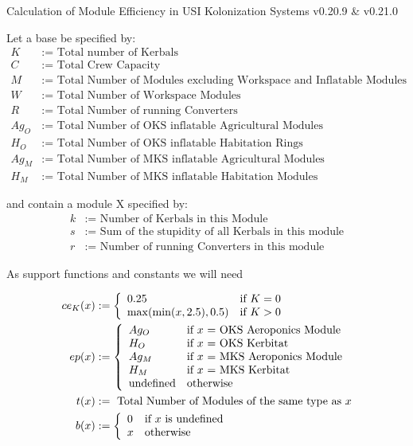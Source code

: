 \documentclass[10pt]{report}
\begin{document}
Calculation of Module Efficiency in USI Kolonization Systems v0.20.9 \& v0.21.0

Let a base be specified by:
\begin{align*}
  K & := \textrm{ Total number of Kerbals}\\
  C & := \textrm{ Total Crew Capacity}\\
  M & := \textrm{ Total Number of Modules excluding Workspace and Inflatable Modules}\\
  W & := \textrm{ Total Number of Workspace Modules}\\
  R & := \textrm{ Total Number of running Converters}\\
  Ag_O & := \textrm{ Total Number of OKS inflatable Agricultural Modules}\\
  H_O & := \textrm{ Total Number of OKS inflatable Habitation Rings}\\
  Ag_M & := \textrm{ Total Number of MKS inflatable Agricultural Modules}\\
  H_M & := \textrm{ Total Number of MKS inflatable Habitation Modules}
\end{align*}

and contain a module X specified by:
\begin{align*}
  k & := \textrm{ Number of Kerbals in this Module}\\
  s & := \textrm{ Sum of the stupidity of all Kerbals in this module}\\
  r & := \textrm{ Number of running Converters in this module}
\end{align*}

As support functions and constants we will need

\begin{align*}
ce_K(x) & := \left\{
  \begin{array}{l l}
    0.25 & \textrm{if } K = 0\\
    \max(\min(x, 2.5), 0.5) &\textrm{if } K > 0
  \end{array}
\right.\\
ep(x) & :=\left\{
  \begin{array}{l l}
    Ag_O & \textrm{if $x$ = OKS Aeroponics Module}\\
    H_O & \textrm{if $x$ = OKS Kerbitat}\\
    Ag_M & \textrm{if $x$ = MKS Aeroponics Module}\\
    H_M & \textrm{if $x$ = MKS Kerbitat}\\
    \textrm{undefined} & \textrm{otherwise}
  \end{array}
\right.\\
t(x) & := \textrm{ Total Number of Modules of the same type as $x$}\\
b(x) & := \left\{
  \begin{array}{l l}
    0 & \textrm{if $x$ is undefined}\\
    x & \textrm{otherwise}
  \end{array}
\right.
\end{align*}
\end{document}
